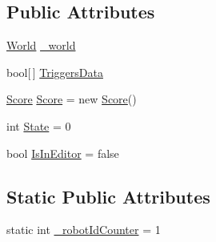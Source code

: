 \subsection*{Public Attributes}
\begin{DoxyCompactItemize}
\item 
\hyperlink{class_farseer_physics_1_1_dynamics_1_1_world}{World} \hyperlink{classgearit_1_1src_1_1robot_1_1_robot_aaa30736c9c217f099dec487a0c99efca}{\+\_\+world}
\item 
bool\mbox{[}$\,$\mbox{]} \hyperlink{classgearit_1_1src_1_1robot_1_1_robot_a2d6e2509c28ad24b6a0f5d187dfcbd87}{Triggers\+Data}
\item 
\hyperlink{classgearit_1_1src_1_1game_1_1_score}{Score} \hyperlink{classgearit_1_1src_1_1robot_1_1_robot_a74cc5798006b9a50635d6615a4f0d873}{Score} = new \hyperlink{classgearit_1_1src_1_1game_1_1_score}{Score}()
\item 
int \hyperlink{classgearit_1_1src_1_1robot_1_1_robot_aff534ece12ba7e6b6dee626e97762589}{State} = 0
\item 
bool \hyperlink{classgearit_1_1src_1_1robot_1_1_robot_a89e97a75a4fe16fe8cefb33dcd78cce3}{Is\+In\+Editor} = false
\end{DoxyCompactItemize}
\subsection*{Static Public Attributes}
\begin{DoxyCompactItemize}
\item 
static int \hyperlink{classgearit_1_1src_1_1robot_1_1_robot_a6fe19c5744472ee8187b6accc87400d3}{\+\_\+robot\+Id\+Counter} = 1
\end{DoxyCompactItemize}

